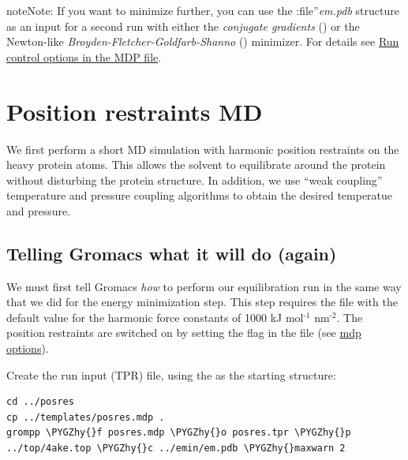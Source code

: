 \documentclass[letterpaper,10pt,english]{sphinxmanual}
\def\PYGZhy{\char`\-}
\begin{document}
\begin{notice}{note}{Note:}
If you want to minimize further, you can use the :file''\emph{em.pdb}
structure as an input for a second run with either the \emph{conjugate
gradients} () or the Newton-like
\emph{Broyden-Fletcher-Goldfarb-Shanno} ()
minimizer. For details see \href{http://manual.gromacs.org/current/online/mdp\_opt.html\#run}{Run control options in the MDP file}.
\end{notice}


\chapter{Position restraints MD}
\label{position_restraints_MD:position-restraints-md}\label{position_restraints_MD::doc}\label{position_restraints_MD:position-restraints}\label{position_restraints_MD:atom-record-of-a-pdb-file}
We first perform a short MD simulation with harmonic position
restraints on the heavy protein atoms. This allows the solvent to
equilibrate around the protein without disturbing the protein
structure. In addition, we use ``weak coupling'' temperature and
pressure coupling algorithms to obtain the desired temperatue and
pressure.


\section{Telling Gromacs what it will do (again)}
\label{position_restraints_MD:telling-gromacs-what-it-will-do-again}
We must first tell Gromacs \emph{how} to perform our equilibration run
in the same way that we did for the energy minimization step.
This step requires the  file with the
default value for the harmonic force constants of 1000
kJ mol$^{\text{-1}}$ nm$^{\text{-2}}$. The position restraints are switched on by setting the
 flag in the  file (see \href{http://manual.gromacs.org/current/online/mdp\_opt.html}{mdp options}).

Create the run input (TPR) file, using the {\hyperref[energy_minimization:energy-minimization]{\emph{}}} as the starting structure:

\begin{Verbatim}[commandchars=\\\{\}]
cd ../posres
cp ../templates/posres.mdp .
grompp \PYGZhy{}f posres.mdp \PYGZhy{}o posres.tpr \PYGZhy{}p ../top/4ake.top \PYGZhy{}c ../emin/em.pdb \PYGZhy{}maxwarn 2
\end{Verbatim}
\end{document}
